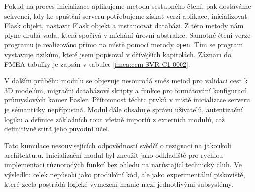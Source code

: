 \documentclass[FM,DP,fonts]{tulthesis}
\begin{document}
\begin{table}[p]
	\centering
	\caption{Příklad záznamu vady: Nekonzistentní zdroj konfigurace}
	\label{fmea:ccm-SVR-C1-0001}
\end{table}

Pokud na proces inicializace aplikujeme metodu sestupného čtení, pak dostáváme sekvenci, kdy ke spuštění serveru potřebujeme získat verzi aplikace, inicializovat Flask objekt, nastavit Flask objekt a instancovat databázi. Z této metody nám plyne druhá vada, která spočívá v míchání úrovní abstrakce. Samotné čtení verze programu je realizováno přímo na místě pomocí metody \texttt{open}. Tím se program vystavuje rizikům, které jsem popisoval v dřívějších kapitolách. Záznam do FMEA tabulky je zapsán v tabulce \ref{fmea:ccm-SVR-C1-0002}.

\begin{table}[p]
	\centering
	\caption{Příklad záznamu vady: Narušení rozdělení na úrovně abstrakce při čtení verze}
	\label{fmea:ccm-SVR-C1-0002}
\end{table}

V dalším průběhu modulu se objevuje nesourodá směs metod pro validaci cest k 3D modelům, migrační databázové skripty a funkce pro formátování konfigurací průmyslových kamer Basler. Přítomnost těchto prvků v místě inicializace serveru je sémanticky nepřípustná. Modul dále obsahuje správu uživatelů, autentizační logiku a definice základních rout včetně importů z externích modulů, což definitivně stírá jeho původní účel.

Tato kumulace nesouvisejících odpovědností svědčí o rezignaci na jakoukoli architekturu. Inicializační modul byl zneužit jako odkladiště pro rychlou implementaci různorodých funkcí bez ohledu na narůstající technický dluh. Ve výsledku celek nepůsobí jako produkční kód, ale jako experimentální pískoviště, které zcela postrádá logické vymezení hranic mezi jednotlivými subsystémy.
\end{document}
